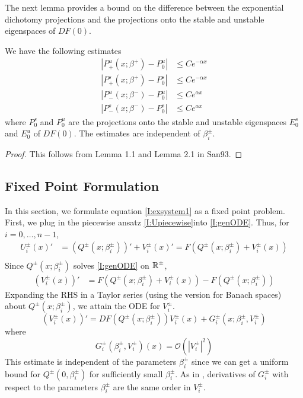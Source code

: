 \documentclass[thesis.tex]{subfiles}
\begin{document}
The next lemma provides a bound on the difference between the exponential dichotomy projections and the projections onto the stable and unstable eigenspaces of $DF(0)$.


\begin{lemma}\label{projdifflemma}
We have the following estimates
\begin{equation}\label{projdiffest}
\begin{aligned}
|P^u_+(x; \beta^+) - P_0^u| &\leq C e^{-\alpha x} \\
|P^s_+(x; \beta^+) - P_0^s| &\leq C e^{-\alpha x} \\
|P^u_-(x; \beta^-) - P_0^u| &\leq C e^{\alpha x} \\
|P^s_-(x; \beta^-) - P_0^s| &\leq C e^{\alpha x} 
\end{aligned}
\end{equation}
where $P_0^s$ and $P_0^u$ are the projections onto the stable and unstable eigenspaces $E_0^s$ and $E_0^u$ of $DF(0)$. The estimates are independent of $\beta_i^\pm$.
\begin{proof}
This follows from Lemma 1.1 and Lemma 2.1 in San93.
\end{proof}
\end{lemma}

\subsection{Fixed Point Formulation}

In this section, we formulate equation \eqref{I:exsystem1} as a fixed point problem. First, we plug in the piecewise ansatz \eqref{I:Upiecewise}into \eqref{I:genODE}. Thus, for $i = 0, \dots, n-1$, 
\begin{align*}
U_i^\pm(x)' &= (Q^\pm(x; \beta_i^\pm))' + V_i^\pm(x)' = F\left(Q^\pm(x; \beta_i^\pm) + V_i^\pm(x) \right) \\
\end{align*}
Since $Q^\pm(x; \beta_i^\pm)$ solves \eqref{I:genODE} on ${\mathbb R}^\pm$, 
\begin{align*}
(V_i^\pm(x))' &= F\left(Q^\pm(x; \beta_i^\pm) + V_i^\pm(x) \right) - F(Q^\pm(x; \beta_i^\pm))
\end{align*}
Expanding the RHS in a Taylor series (using the version for Banach spaces) about $Q^\pm(x; \beta_i^\pm)$, we attain the ODE for $V_i^\pm$.
\begin{equation}\label{Vpiecewise}
(V_i^\pm(x))' = DF(Q^\pm(x; \beta_i^\pm)) V_i^\pm(x) + G_i^\pm(x; \beta_i^\pm, V_i^\pm)
\end{equation}
where 
\begin{equation}\label{Gquadratic}
G_i^\pm(\beta_i^\pm, V_i^\pm)(x) = \mathcal{O}(|V_i^\pm|^2)
\end{equation}
This estimate is independent of the parameters $\beta_i^\pm$ since we can get a uniform bound for $Q^\pm(0, \beta_i^\pm)$ for sufficiently small $\beta_i^\pm$. As in \cite{Sandstede1997}, derivatives of $G_i^\pm$ with respect to the parameters $\beta_i^\pm$ are the same order in $V_i^\pm$.
\end{document}

